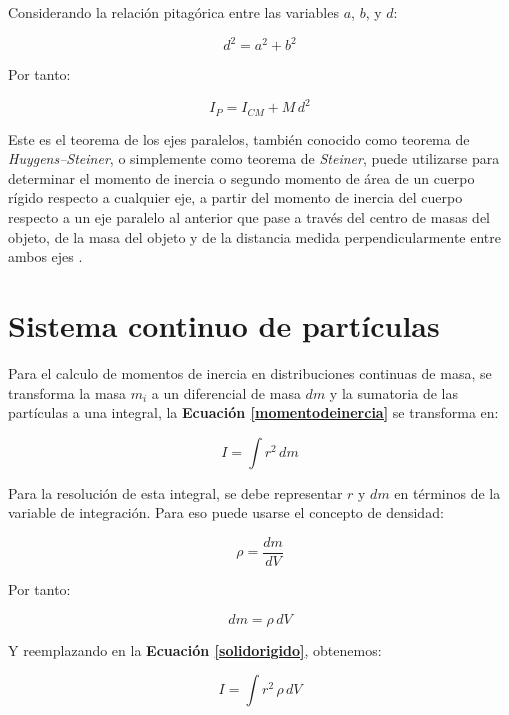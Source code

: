 \documentclass[letter,twoside,11pt]{article}
\begin{document}
Considerando la relación pitagórica entre las variables $a$, $b$, y $d$:

\begin{equation*}
    d^2 = a^2 + b^2
\end{equation*}

Por tanto:

\begin{equation}
    I_{P} = I_{CM} + M\, d^2
\end{equation}

Este es el teorema de los ejes paralelos, también conocido como teorema de 
\emph{Huygens–Steiner}, o simplemente como teorema de \emph{Steiner}, puede
utilizarse para determinar el momento de inercia o segundo momento de área de
un cuerpo rígido respecto a cualquier eje, a partir del momento de inercia del
cuerpo respecto a un eje paralelo al anterior que pase a través del centro de
masas del objeto, de la masa del objeto y de la distancia medida
perpendicularmente entre ambos ejes \cite{WIKI1}.

\section{Sistema continuo de partículas \cite{Sears}}

Para el calculo de momentos de inercia en distribuciones continuas de masa, se
transforma la masa $m_i$ a un diferencial de masa $dm$ y la sumatoria de las
partículas a una integral, la \textbf{Ecuación \ref{momentodeinercia}} se
transforma en:

\begin{equation}
    I = \int r^2\, dm
\label{solidorigido}
\end{equation}

Para la resolución de esta integral, se debe representar $r$ y $dm$ en términos
de la variable de integración. Para eso puede usarse el concepto de densidad:

\begin{equation}
    \rho = \frac{dm}{dV}
\label{densidad}
\end{equation}

Por tanto:

\begin{equation*}
    dm = \rho\, dV
\end{equation*}

Y reemplazando en la \textbf{Ecuación \ref{solidorigido}}, obtenemos:

\begin{equation*}
    I = \int r^2\, \rho\, dV
\end{equation*}
\end{document}
